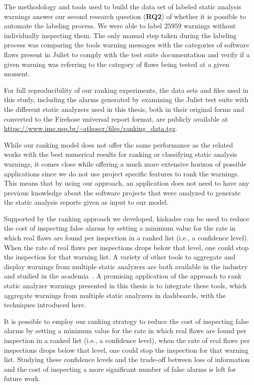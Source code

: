 The methodology and tools used to build the data set of labeled static analysis
warnings answer our second research question (\textbf{RQ2}) of whether it is
possible to automate the labeling process. We were able to 
label $25959$ warnings without individually inspecting them. The only manual step
taken during the labeling process was comparing the tools warning messages with
the categories of software flaws present in Juliet to comply with the test suite
documentation and verify if a given warning was referring to the category of flaws
being tested at a given moment.

For full reproducibility of our ranking experiments, the data sets and files
used in this study, including the alarms generated by examining the Juliet test
suite with the different static analyzers used in this thesis, both in their
original forms and converted to the Firehose universal report format, are
publicly available at
\url{https://www.ime.usp.br/~athoscr/files/ranking_data.tgz}.

While our ranking model does not offer the same performance as the related
works with the best numerical results for ranking or classifying static
analysis warnings, it comes close while offering a much more extensive horizon
of possible applications since we do not use project specific features to rank
the warnings. This means that by using our approach, an application does not
need to have any previous knowledge about the software projects that were
analyzed to generate the static analysis reports given as input to our model.

Supported by the ranking approach we developed, kiskadee can be used to reduce the
cost of inspecting false alarms by setting a minimum value for the rate in
which real flaws are found per inspection in a ranked list (i.e., a confidence
level). When the rate of real flaws per inspections drops below that level, one
could stop the inspection for that warning list. A variety of other tools to
aggregate and display warnings from multiple static analyzers are both
available in the industry and studied in the academia~\citep{buckers2017uav,
heinemann2014teamscale}. A promising application of the approach to rank static
analyzer warnings presented in this thesis is to integrate these tools, which
aggregate warnings from multiple static analyzers in dashboards, with the
techniques introduced here. 

It is possible to employ our ranking strategy to reduce the cost of
inspecting false alarms by setting a minimum value for the rate in which real
flaws are found per inspection in a ranked list (i.e., a confidence level),
when the rate of real flaws per inspections drops below that level, one could
stop the inspection for that warning list. Studying these confidence levels and
the trade-off between loss of information and the cost of inspecting a more significant
number of false alarms is left for future work.

